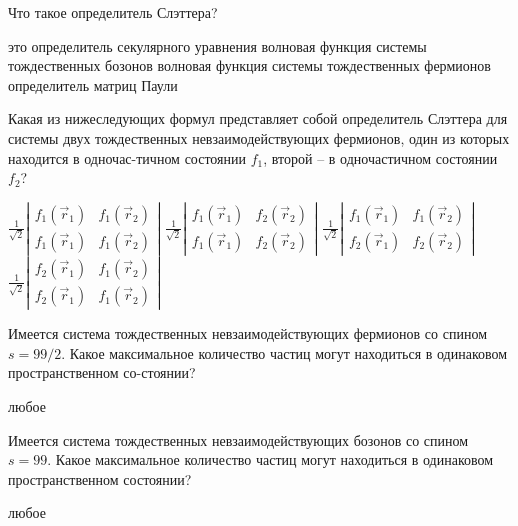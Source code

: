 \documentclass[11pt,a4paper]{exam}
\begin{document}
\begin{questions}
\question Что такое определитель Слэттера?
\begin{choices}
\choice это определитель секулярного уравнения
\choice волновая функция системы тождественных бозонов 
\choice волновая функция системы тождественных фермионов
\choice определитель матриц Паули
\end{choices}

\question Какая из нижеследующих формул представляет собой определитель Слэттера для системы двух тождественных невзаимодействующих фермионов, один из которых находится в одночас-тичном состоянии ${f_1}$, второй – в одночастичном состоянии ${f_2}$?
\begin{choices}
\choice $\frac{1}{{\sqrt 2 }}\left| {\begin{array}{*{20}{c}}
{{f_1}({{\vec r}_1})}&{{f_1}({{\vec r}_2})}\\
{{f_1}({{\vec r}_1})}&{{f_1}({{\vec r}_2})}
\end{array}} \right|$               
\choice $\frac{1}{{\sqrt 2 }}\left| {\begin{array}{*{20}{c}}
{{f_1}({{\vec r}_1})}&{{f_2}({{\vec r}_2})}\\
{{f_1}({{\vec r}_1})}&{{f_2}({{\vec r}_2})}
\end{array}} \right|$
\choice $\frac{1}{{\sqrt 2 }}\left| {\begin{array}{*{20}{c}}
{{f_1}({{\vec r}_1})}&{{f_1}({{\vec r}_2})}\\
{{f_2}({{\vec r}_1})}&{{f_2}({{\vec r}_2})}
\end{array}} \right|$               
\choice $\frac{1}{{\sqrt 2 }}\left| {\begin{array}{*{20}{c}}
{{f_2}({{\vec r}_1})}&{{f_1}({{\vec r}_2})}\\
{{f_2}({{\vec r}_1})}&{{f_1}({{\vec r}_2})}
\end{array}} \right|$
\end{choices}

\question Имеется система тождественных невзаимодействующих фермионов со спином $s = 99/2$. Какое максимальное количество частиц могут находиться в одинаковом пространственном со-стоянии?
\begin{choices}
\choice любое
\end{choices}

\question Имеется система тождественных невзаимодействующих бозонов со спином $s = 99$. Какое максимальное количество частиц могут находиться в одинаковом пространственном состоянии?
\begin{choices}
\choice любое
\end{choices}


\end{questions}
\end{document}
